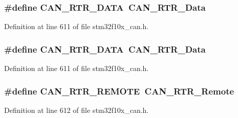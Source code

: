 \subsubsection[{\texorpdfstring{C\+A\+N\+\_\+\+R\+T\+R\+\_\+\+D\+A\+TA}{CAN_RTR_DATA}}]{\setlength{\rightskip}{0pt plus 5cm}\#define C\+A\+N\+\_\+\+R\+T\+R\+\_\+\+D\+A\+TA~{\bf C\+A\+N\+\_\+\+R\+T\+R\+\_\+\+Data}}\hypertarget{group___c_a_n___legacy_gab1e89074b4fcfebf81c323909625b0d0}{}\label{group___c_a_n___legacy_gab1e89074b4fcfebf81c323909625b0d0}


Definition at line 611 of file stm32f10x\+\_\+can.\+h.

\subsubsection[{\texorpdfstring{C\+A\+N\+\_\+\+R\+T\+R\+\_\+\+D\+A\+TA}{CAN_RTR_DATA}}]{\setlength{\rightskip}{0pt plus 5cm}\#define C\+A\+N\+\_\+\+R\+T\+R\+\_\+\+D\+A\+TA~{\bf C\+A\+N\+\_\+\+R\+T\+R\+\_\+\+Data}}\hypertarget{group___c_a_n___legacy_gab1e89074b4fcfebf81c323909625b0d0}{}\label{group___c_a_n___legacy_gab1e89074b4fcfebf81c323909625b0d0}


Definition at line 611 of file stm32f10x\+\_\+can.\+h.

\subsubsection[{\texorpdfstring{C\+A\+N\+\_\+\+R\+T\+R\+\_\+\+R\+E\+M\+O\+TE}{CAN_RTR_REMOTE}}]{\setlength{\rightskip}{0pt plus 5cm}\#define C\+A\+N\+\_\+\+R\+T\+R\+\_\+\+R\+E\+M\+O\+TE~{\bf C\+A\+N\+\_\+\+R\+T\+R\+\_\+\+Remote}}\hypertarget{group___c_a_n___legacy_gab15c649e3e497c6d1145bb98ff7f3f04}{}\label{group___c_a_n___legacy_gab15c649e3e497c6d1145bb98ff7f3f04}


Definition at line 612 of file stm32f10x\+\_\+can.\+h.

